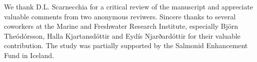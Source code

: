 


\begin{acknowledgements}
We thank D.L. Scarnecchia for a critical review of the manuscript and appreciate valuable comments from two anonymous reviwers. Sincere thanks to several coworkers at the Marine and Freshwater Research Institute, especially Björn Theódórsson, Halla Kjartansdóttir and Eydís Njarðardóttir for their valuable contribution.  
The study was partially supported by the Salmonid Enhancement Fund in Iceland.
\end{acknowledgements}


